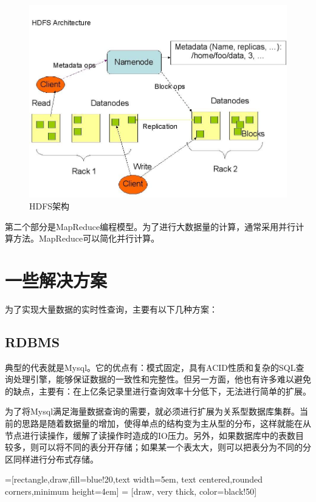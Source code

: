 \begin{figure}[!ht]
\centering
\includegraphics[scale=0.5]{photo/HDFS.jpg}
\caption{HDFS架构}
\end{figure} 


  第二个部分是MapReduce编程模型。为了进行大数据量的计算，通常采用并行计算方法。MapReduce可以简化并行计算。

\section{一些解决方案}
  为了实现大量数据的实时性查询，主要有以下几种方案：
\subsection{RDBMS}
  典型的代表就是Mysql。它的优点有：模式固定，具有ACID性质和复杂的SQL查询处理引擎，能够保证数据的一致性和完整性。但另一方面，他也有许多难以避免的缺点，主要有：在上亿条记录里进行查询效率十分低下，无法进行简单的扩展。


  为了将Mysql满足海量数据查询的需要，就必须进行扩展为关系型数据库集群。当前的思路是随着数据量的增加，使得单点的结构变为主从型的分布，这样就能在从节点进行读操作，缓解了读操作时造成的IO压力。另外，如果数据库中的表数目较多，则可以将不同的表分开存储；如果某一个表太大，则可以把表分为不同的分区同样进行分布式存储。


=[rectangle,draw,fill=blue!20,text width=5em,
text centered,rounded corners,minimum height=4em]
 = [draw, very thick, color=black!50]


